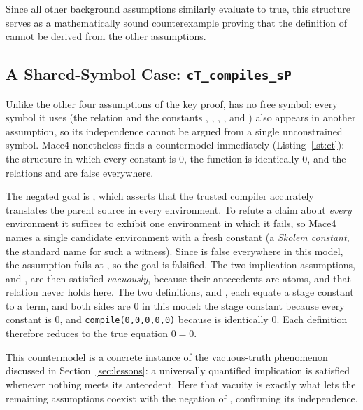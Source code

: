 Since all other background assumptions similarly evaluate to true, this structure serves as a mathematically sound counterexample proving that the definition of  cannot be derived from the other assumptions.

\subsection{A Shared-Symbol Case: \texttt{cT\_compiles\_sP}}

Unlike the other four assumptions of the key proof,  has no free symbol: every symbol it uses (the relation  and the constants , , , , and ) also appears in another assumption, so its independence cannot be argued from a single unconstrained symbol. Mace4 nonetheless finds a countermodel immediately (Listing~\ref{lst:ct}): the structure in which every constant is $0$, the function  is identically $0$, and the relations  and  are false everywhere.

The negated goal is , which asserts that the trusted compiler  accurately translates the parent source  in every environment. To refute a claim about \emph{every} environment it suffices to exhibit one environment in which it fails, so Mace4 names a single candidate environment with a fresh constant  (a \emph{Skolem constant}, the standard name for such a witness). Since  is false everywhere in this model, the assumption fails at , so the goal is falsified. The two implication assumptions,  and , are then satisfied \emph{vacuously}, because their antecedents are  atoms, and that relation never holds here. The two definitions,  and , each equate a stage constant to a  term, and both sides are $0$ in this model: the stage constant because every constant is $0$, and \texttt{compile(0,0,0,0,0)} because  is identically $0$. Each definition therefore reduces to the true equation $0 = 0$.

This countermodel is a concrete instance of the vacuous-truth phenomenon discussed in Section~\ref{sec:lessons}: a universally quantified implication is satisfied whenever nothing meets its antecedent. Here that vacuity is exactly what lets the remaining assumptions coexist with the negation of , confirming its independence.

